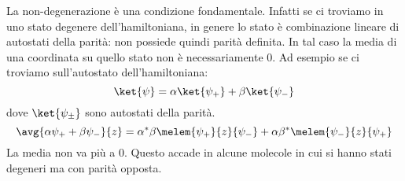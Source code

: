 La non-degenerazione è una condizione fondamentale. Infatti se ci troviamo in uno stato degenere dell'hamiltoniana, in genere lo stato è combinazione lineare di autostati della parità: non possiede quindi parità definita. In tal caso la media di una coordinata su quello stato non è necessariamente $0$.
Ad esempio se ci troviamo sull'autostato dell'hamiltoniana:
\begin{equation}
\ket{\psi} = \alpha \ket{\psi_+}+\beta\ket{\psi_-}
\end{equation}
dove $\ket{\psi_\pm}$ sono autostati della parità.
\begin{equation}
\avg{\alpha\psi_++\beta\psi_-}{z} = \alpha^*\beta \melem{\psi_+}{z}{\psi_-}+ \alpha\beta^*\melem{\psi_-}{z}{\psi_+}
\end{equation}
La media non va più a 0. Questo accade in alcune molecole in cui si hanno stati degeneri ma con parità opposta.

